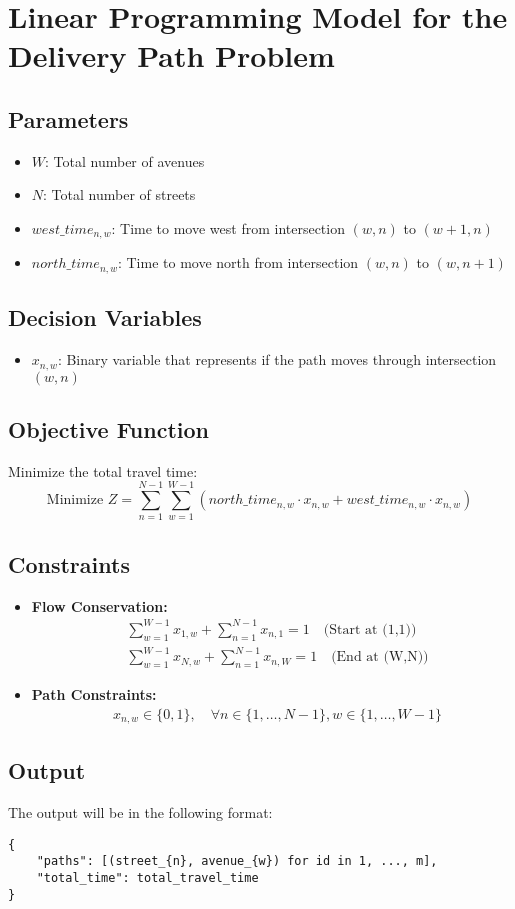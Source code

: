 \documentclass{article}
\begin{document}
\section*{Linear Programming Model for the Delivery Path Problem}

\subsection*{Parameters}
\begin{itemize}
    \item $W$: Total number of avenues
    \item $N$: Total number of streets
    \item $west\_time_{n,w}$: Time to move west from intersection $(w, n)$ to $(w+1, n)$
    \item $north\_time_{n,w}$: Time to move north from intersection $(w, n)$ to $(w, n+1)$
\end{itemize}

\subsection*{Decision Variables}
\begin{itemize}
    \item $x_{n,w}$: Binary variable that represents if the path moves through intersection $(w, n)$
\end{itemize}

\subsection*{Objective Function}
Minimize the total travel time:
\[
\text{Minimize } Z = \sum_{n=1}^{N-1} \sum_{w=1}^{W-1} (north\_time_{n,w} \cdot x_{n,w} + west\_time_{n,w} \cdot x_{n,w})
\]

\subsection*{Constraints}
\begin{itemize}
    \item \textbf{Flow Conservation:}
    \begin{align*}
    &\sum_{w=1}^{W-1} x_{1,w} + \sum_{n=1}^{N-1} x_{n,1} = 1 \quad \text{(Start at (1,1))} \\
    &\sum_{w=1}^{W-1} x_{N,w} + \sum_{n=1}^{N-1} x_{n,W} = 1 \quad \text{(End at (W,N))}
    \end{align*}
    
    \item \textbf{Path Constraints:}
    \begin{align*}
    &x_{n,w} \in \{0, 1\}, \quad \forall n \in \{1, \ldots, N-1\}, w \in \{1, \ldots, W-1\}
    \end{align*}
\end{itemize}

\subsection*{Output}
The output will be in the following format:
\begin{verbatim}
{
    "paths": [(street_{n}, avenue_{w}) for id in 1, ..., m],
    "total_time": total_travel_time
}
\end{verbatim}
\end{document}
